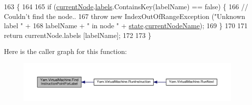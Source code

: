 \begin{DoxyCode}
163                                                                     \{
164 
165             \textcolor{keywordflow}{if} (\hyperlink{a00156_ab7594e14981ad75cecea3b2e7dcf895c}{currentNode}.\hyperlink{a00045_a9afa49f4fbc72e806a0210cb4198f12e}{labels}.ContainsKey(labelName) == \textcolor{keyword}{false}) \{
166                 \textcolor{comment}{// Couldn't find the node..}
167                 \textcolor{keywordflow}{throw} \textcolor{keyword}{new} IndexOutOfRangeException (\textcolor{stringliteral}{"Unknown label "} +
168                     labelName + \textcolor{stringliteral}{" in node "} + \hyperlink{a00156_a70f2ce6201cdd2430ceaa764ac614ca0}{state}.\hyperlink{a00159_a86f481fad527f719b49f8fee6ff79764}{currentNodeName});
169             \}
170 
171             \textcolor{keywordflow}{return} currentNode.labels [labelName];
172 
173         \}
\end{DoxyCode}


Here is the caller graph for this function\-:
\nopagebreak
\begin{figure}[H]
\begin{center}
\leavevmode
\includegraphics[width=350pt]{a00156_af613c8b2d098678b6ea05b509c0a0cb6_icgraph}
\end{center}
\end{figure}


